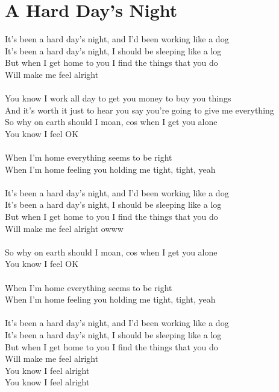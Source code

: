 \section{A Hard Day's Night}
It's been a hard day's night, and I'd been working like a dog\\
It's been a hard day's night, I should be sleeping like a log\\
But when I get home to you I find the things that you do\\
Will make me feel alright\\
\\
You know I work all day to get you money to buy you things\\
And it's worth it just to hear you say you're going to give me everything\\
So why on earth should I moan, cos when I get you alone\\
You know I feel OK\\
\\
When I'm home everything seems to be right\\
When I'm home feeling you holding me tight, tight, yeah\\
\\
It's been a hard day's night, and I'd been working like a dog\\
It's been a hard day's night, I should be sleeping like a log\\
But when I get home to you I find the things that you do\\
Will make me feel alright owww\\
\\
So why on earth should I moan, cos when I get you alone\\
You know I feel OK\\
\\
When I'm home everything seems to be right\\
When I'm home feeling you holding me tight, tight, yeah\\
\\
It's been a hard day's night, and I'd been working like a dog\\
It's been a hard day's night, I should be sleeping like a log\\
But when I get home to you I find the things that you do\\
Will make me feel alright\\
You know I feel alright\\
You know I feel alright\\